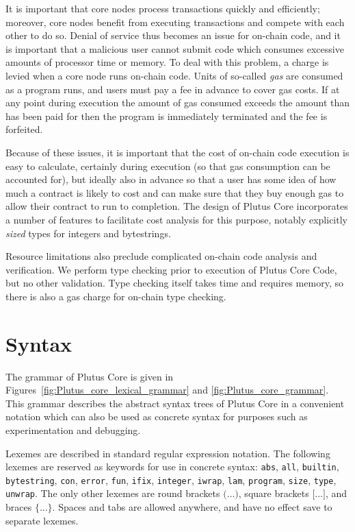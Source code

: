 \documentclass[a4paper]{article}
\begin{document}
It is important that core nodes process transactions quickly and
efficiently; moreover, core nodes benefit from executing transactions
and compete with each other to do so.  Denial of service thus becomes
an issue for on-chain code, and it is important that a malicious user
cannot submit code which consumes excessive amounts of processor time
or memory. To deal with this problem, a charge is levied when a core
node runs on-chain code.  Units of so-called \textit{gas} are consumed
as a program runs, and users must pay a fee in advance to cover gas
costs.  If at any point during execution the amount of gas consumed
exceeds the amount than has been paid for then the program is
immediately terminated and the fee is forfeited.

Because of these issues, it is important that the cost of on-chain
code execution is easy to calculate, certainly during execution (so
that gas consumption can be accounted for), but ideally also in
advance so that a user has some idea of how much a contract is likely
to cost and can make sure that they buy enough gas to allow their
contract to run to completion.  The design of Plutus Core incorporates
a number of features to facilitate cost analysis for this purpose,
notably explicitly \textit{sized} types for integers and bytestrings.

Resource limitations also preclude complicated on-chain code analysis
and verification.  We perform type checking prior to execution of
Plutus Core Code, but no other validation.  Type checking itself takes
time and requires memory, so there is also a gas charge for on-chain
type checking.

\section{Syntax}

The grammar of Plutus Core is given in
Figures~\ref{fig:Plutus_core_lexical_grammar} and
\ref{fig:Plutus_core_grammar}. This grammar describes the abstract
syntax trees of Plutus Core in a convenient notation which can also be
used as concrete syntax for purposes such as experimentation and
debugging.

Lexemes are described in standard regular expression notation.  The
following lexemes are reserved as keywords for use in concrete syntax:
\texttt{abs}, \texttt{all}, \texttt{builtin}, \texttt{bytestring},
\texttt{con}, \texttt{error}, \texttt{fun}, \texttt{ifix},
\texttt{integer}, \texttt{iwrap}, \texttt{lam}, \texttt{program},
\texttt{size}, \texttt{type}, \texttt{unwrap}.  The only other lexemes
are round brackets $\texttt{(}\ldots\texttt{)}$, square brackets
$\texttt{[}\ldots\texttt{]}$, and braces
$\texttt{\{}\ldots\texttt{\}}$.  Spaces and tabs are allowed anywhere,
and have no effect save to separate lexemes.
\end{document}
